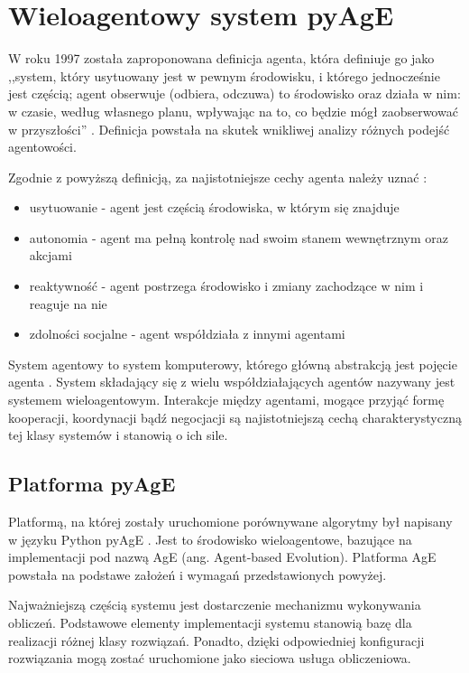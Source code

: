 \chapter{Wieloagentowy system pyAgE}
\label{cha:pyage}
W roku 1997 została zaproponowana definicja agenta, która definiuje go jako ,,system, który usytuowany jest w pewnym środowisku, i którego jednocześnie jest częścią; agent obserwuje (odbiera, odczuwa) to środowisko oraz działa w nim: w czasie, według własnego planu, wpływając na to, co będzie mógł zaobserwować w przyszłości'' \cite{opisagenta}. Definicja powstała na skutek wnikliwej analizy różnych podejść agentowości.

Zgodnie z powyższą definicją, za najistotniejsze cechy agenta należy uznać \cite{agentowyemas}:
\begin{itemize}
\item usytuowanie - agent jest częścią środowiska, w którym się znajduje
\item autonomia - agent ma pełną kontrolę nad swoim stanem wewnętrznym oraz akcjami
\item reaktywność - agent postrzega środowisko i zmiany zachodzące w nim i reaguje na nie
\item zdolności socjalne - agent współdziała z innymi agentami
\end{itemize}

System agentowy to system komputerowy, którego główną abstrakcją jest pojęcie agenta \cite{systemagentowy}. System składający się z wielu współdziałających agentów nazywany jest systemem wieloagentowym. Interakcje między agentami, mogące przyjąć formę kooperacji, koordynacji bądź negocjacji są najistotniejszą cechą charakterystyczną tej klasy systemów i stanowią o ich sile. 

\section{Platforma pyAgE}
\label{sec:pyageopis}
Platformą, na której zostały uruchomione porównywane algorytmy był napisany w języku Python pyAgE \cite{pyagestrona} \cite{pyage}. Jest to środowisko wieloagentowe, bazujące na implementacji pod nazwą AgE (ang. Agent-based Evolution). Platforma AgE powstała na podstawe założeń i wymagań przedstawionych powyżej.

Najważniejszą częścią systemu jest dostarczenie mechanizmu wykonywania obliczeń. Podstawowe elementy implementacji systemu stanowią bazę dla realizacji różnej klasy rozwiązań. Ponadto, dzięki odpowiedniej konfiguracji rozwiązania mogą zostać uruchomione jako sieciowa usługa obliczeniowa.

